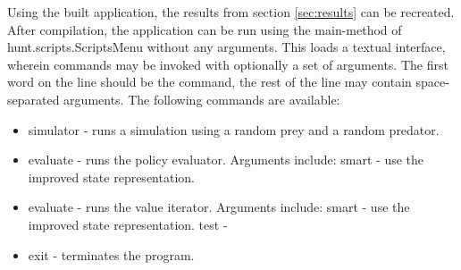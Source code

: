 Using the built application, the results from section \ref{sec:results} can be recreated. After compilation, the application can be run using the main-method of hunt.scripts.ScriptsMenu without any arguments. This loads a textual interface, wherein commands may be invoked with optionally a set of arguments. The first word on the line should be the command, the rest of the line may contain space-separated arguments. The following commands are available:

\begin{itemize}
  \item simulator - runs a simulation using a random prey and a random predator.
  \item evaluate - runs the policy evaluator. Arguments include:
    \subitem smart - use the improved state representation.
  \item evaluate - runs the value iterator. Arguments include:
    \subitem smart - use the improved state representation.
     \subitem test -
  \item exit - terminates the program.
\end{itemize}
